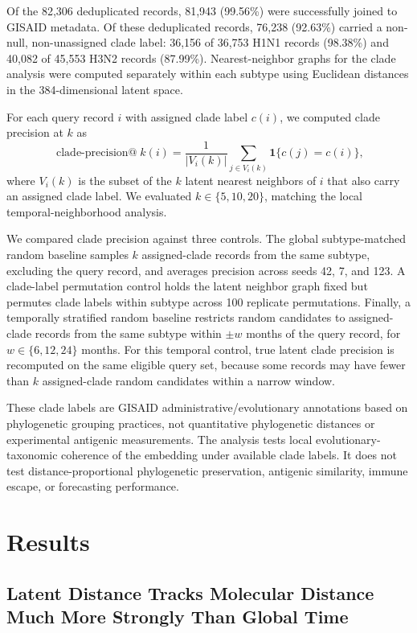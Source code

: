 \documentclass[11pt]{article}
\begin{document}
Of the 82,306 deduplicated records, 81,943 (99.56\%) were successfully joined to GISAID metadata. Of these deduplicated records, 76,238 (92.63\%) carried a non-null, non-unassigned clade label: 36,156 of 36,753 H1N1 records (98.38\%) and 40,082 of 45,553 H3N2 records (87.99\%). Nearest-neighbor graphs for the clade analysis were computed separately within each subtype using Euclidean distances in the 384-dimensional latent space.

For each query record $i$ with assigned clade label $c(i)$, we computed clade precision at $k$ as
\[
\operatorname{clade\text{-}precision@}k(i)=
\frac{1}{|V_i(k)|}\sum_{j\in V_i(k)}\mathbf{1}\{c(j)=c(i)\},
\]
where $V_i(k)$ is the subset of the $k$ latent nearest neighbors of $i$ that also carry an assigned clade label. We evaluated $k\in\{5,10,20\}$, matching the local temporal-neighborhood analysis.

We compared clade precision against three controls. The global subtype-matched random baseline samples $k$ assigned-clade records from the same subtype, excluding the query record, and averages precision across seeds 42, 7, and 123. A clade-label permutation control holds the latent neighbor graph fixed but permutes clade labels within subtype across 100 replicate permutations. Finally, a temporally stratified random baseline restricts random candidates to assigned-clade records from the same subtype within $\pm w$ months of the query record, for $w\in\{6,12,24\}$ months. For this temporal control, true latent clade precision is recomputed on the same eligible query set, because some records may have fewer than $k$ assigned-clade random candidates within a narrow window.

These clade labels are GISAID administrative/evolutionary annotations based on phylogenetic grouping practices, not quantitative phylogenetic distances or experimental antigenic measurements. The analysis tests local evolutionary-taxonomic coherence of the embedding under available clade labels. It does not test distance-proportional phylogenetic preservation, antigenic similarity, immune escape, or forecasting performance.

\section{Results}

\subsection{Latent Distance Tracks Molecular Distance Much More Strongly Than Global Time}
\end{document}
